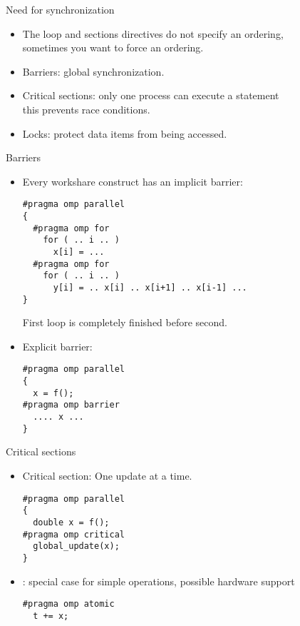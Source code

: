 
\begin{numberedframe}{Need for synchronization}
  \begin{itemize}
  \item The loop and sections directives do not specify an ordering,\\
    sometimes you want to force an ordering.
  \item Barriers: global synchronization.
  \item Critical sections: only one process can execute a statement\\
    this prevents race conditions.
  \item Locks: protect data items from being accessed.
  \end{itemize}
\end{numberedframe}

\begin{numberedframe}{Barriers}
\small
  \begin{itemize}
  \item Every workshare construct has an implicit barrier:
\begin{verbatim}
#pragma omp parallel
{
  #pragma omp for
    for ( .. i .. )
      x[i] = ...
  #pragma omp for
    for ( .. i .. )
      y[i] = .. x[i] .. x[i+1] .. x[i-1] ...
}
\end{verbatim}
First loop is completely finished before second.
\item Explicit barrier:
\begin{verbatim}
#pragma omp parallel
{
  x = f();
#pragma omp barrier
  .... x ...
}
\end{verbatim}
  \end{itemize}
\end{numberedframe}

\begin{numberedframe}{Critical sections}
\begin{itemize}
  \item Critical section: One update at a time.
\begin{verbatim}
#pragma omp parallel
{
  double x = f();
#pragma omp critical
  global_update(x);
}
\end{verbatim}
\item {} : special case for simple operations, possible
  hardware support
\begin{verbatim}
#pragma omp atomic
  t += x;
\end{verbatim}
\end{itemize}
\end{numberedframe}

